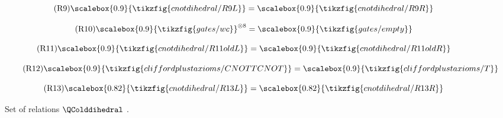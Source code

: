\begin{figure}[ht]
{\begin{minipage}{0.98\textwidth}
        \begin{minipage}[c]{0.53\textwidth}
            \centering
            \begin{equation}\tag{R9}
            \scalebox{0.9}{\tikzfig{cnotdihedral/R9L}}
            =
            \scalebox{0.9}{\tikzfig{cnotdihedral/R9R}}
            \end{equation}
        \end{minipage}
        \begin{minipage}[c]{0.22\textwidth}
            \centering
            \begin{equation}\tag{R10}
                \scalebox{0.9}{\tikzfig{gates/wc}}^{\otimes 8} = \scalebox{0.9}{\tikzfig{gates/empty}}
            \end{equation}
        \end{minipage}
        \begin{minipage}[c]{0.37\textwidth}
            \centering
            \begin{equation}\tag{R11}\label{cnot-old-R11}
            \scalebox{0.9}{\tikzfig{cnotdihedral/R11oldL}}
            =
            \scalebox{0.9}{\tikzfig{cnotdihedral/R11oldR}}
            \end{equation}
        \end{minipage}
        \begin{minipage}[c]{0.33\textwidth}
            \centering
            \begin{equation}\tag{R12}
            \scalebox{0.9}{\tikzfig{cliffordplustaxioms/CNOTTCNOT}}
            =
            \scalebox{0.9}{\tikzfig{cliffordplustaxioms/T}}
            \end{equation}
        \end{minipage}
        \begin{minipage}[c]{0.9\textwidth}
            \centering
            \begin{equation}\tag{R13}
            \scalebox{0.82}{\tikzfig{cnotdihedral/R13L}}
            =
            \scalebox{0.82}{\tikzfig{cnotdihedral/R13R}}
            \end{equation}
        \end{minipage}
        \end{minipage}%
    }
    \caption{Set of relations $\QColddihedral$ \cite{AmyCNOTDihedral}.}
    \label{appendix:oldgraphicallanguage6}
\end{figure}





